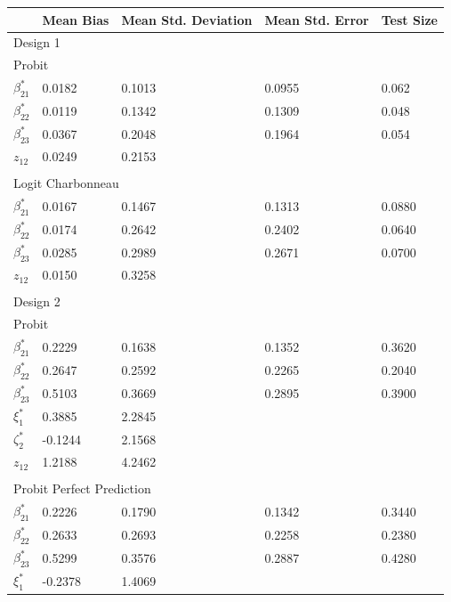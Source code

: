 \begin{table}
\small
\centering
\begin{tabular}{p{3cm}p{1.8cm}p{1.8cm}p{1.8cm}p{1.8cm}}
  \hline
   \quad & Mean Bias & Mean Std. Deviation & Mean Std. Error & Test Size \\
   \hline
   \multicolumn{5}{l}{Design 1} \\
   \hline
    \multicolumn{5}{l}{Probit} \\
    $\beta_{21}^*$ & 0.0182 & 0.1013 & 0.0955 & 0.062\\
    $\beta_{22}^*$ & 0.0119 & 0.1342 & 0.1309 & 0.048\\
    $\beta_{23}^*$ & 0.0367 & 0.2048 & 0.1964 & 0.054\\
     $z_{12}$ & 0.0249 & 0.2153 &  & \\
     & & & & \\
    \hline
    \multicolumn{5}{l}{Logit Charbonneau} \\
    $\beta_{21}^*$ & 0.0167 & 0.1467 & 0.1313 & 0.0880\\
    $\beta_{22}^*$ & 0.0174 & 0.2642 & 0.2402 & 0.0640\\
    $\beta_{23}^*$ & 0.0285 & 0.2989 & 0.2671 & 0.0700\\
    $z_{12}$ &  0.0150 &  0.3258 &  & \\
    & & & & \\
   \hline
   \multicolumn{5}{l}{Design 2} \\
   \hline
    \multicolumn{5}{l}{Probit} \\
    $\beta_{21}^*$ & 0.2229 & 0.1638 & 0.1352 & 0.3620\\
    $\beta_{22}^*$ & 0.2647 & 0.2592 & 0.2265 & 0.2040\\
    $\beta_{23}^*$ & 0.5103 & 0.3669 & 0.2895 & 0.3900\\
    $\xi_{1}^*$ & 0.3885 & 2.2845 &  & \\
    $\zeta_{2}^*$ & -0.1244 & 2.1568 & &\\
     $z_{12}$ & 1.2188 & 4.2462 &  & \\
     & & & & \\
     \hline
     \multicolumn{5}{l}{Probit Perfect Prediction} \\
     $\beta_{21}^*$ & 0.2226 & 0.1790 & 0.1342 & 0.3440\\
     $\beta_{22}^*$ & 0.2633 & 0.2693 & 0.2258 & 0.2380\\
     $\beta_{23}^*$ & 0.5299 & 0.3576 & 0.2887 & 0.4280\\
     $\xi_{1}^*$ & -0.2378 & 1.4069 &  & \\

\end{tabular}
\end{table}
